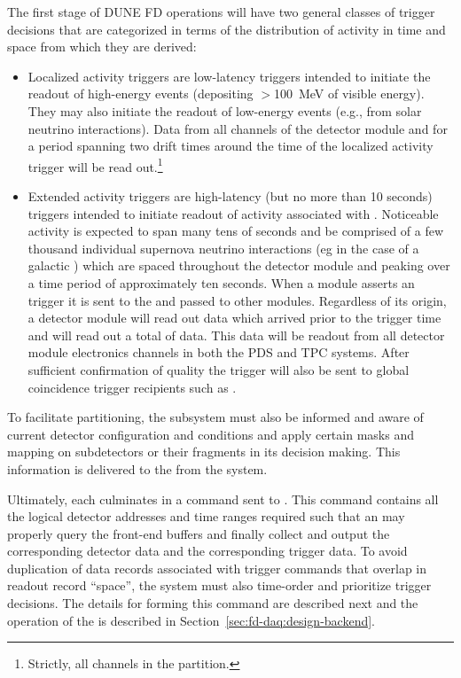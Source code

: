 The first stage of DUNE FD operations will have two general classes of trigger
decisions that are categorized in terms of the distribution of activity
in time and space from which they are derived:
\begin{itemize}
\item Localized activity triggers are low-latency triggers intended to
  initiate the readout of high-energy events (depositing $>$100~MeV of
  visible energy). 
  They may also initiate the readout of low-energy events (e.g., from
  solar neutrino interactions).
  Data from all channels of the detector module and for a period
  spanning two drift times around the time of the localized activity
  trigger will be read out.\footnote{Strictly, all channels in the  partition.}
\item Extended activity triggers are high-latency
  (but no more than 10 seconds) triggers intended to initiate readout of
  activity associated with . 
  Noticeable  activity is expected to span many tens of
  seconds and be comprised of a few thousand individual supernova
  neutrino interactions (eg in the case of a galactic ) which
  are spaced throughout the detector module and peaking over a time
  period of approximately ten seconds.
  When a module asserts an  trigger it is sent to the
   and passed to other modules. 
  Regardless of its origin, a detector module will read out data which
  arrived \snbpretime prior to the trigger time and will read out a
  total of \snbtime data. 
  This data will be readout from all detector module electronics
  channels in both the PDS and TPC systems. 
  After sufficient confirmation of quality the  trigger will
  also be sent to global coincidence trigger recipients such as
  .
\end{itemize}

To facilitate partitioning, the  subsystem must also be
informed and aware of current detector configuration and conditions and
apply certain masks and mapping on subdetectors or their fragments in
its decision making. This information is delivered to the
 from the  system.

Ultimately, each  culminates in a command sent to . 
This command contains all the logical detector addresses and time ranges
required such that an  may properly query the front-end
buffers and finally collect and output the corresponding detector data
and the corresponding trigger data. To avoid duplication of data
records associated with trigger commands that overlap in readout
record ``space'', the  system must also time-order and
prioritize trigger decisions. The details for forming this
command are described next and the operation of the  is
described in Section~\ref{sec:fd-daq:design-backend}.

